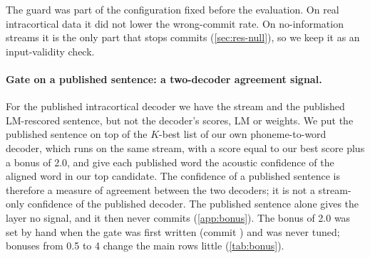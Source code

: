 The guard was part of the configuration fixed before the evaluation. On real intracortical data it did not lower the wrong-commit rate. On no-information streams it is the only part that stops commits (\cref{sec:res-null}), so we keep it as an input-validity check.

\paragraph{Gate on a published sentence: a two-decoder agreement signal.} For the published intracortical decoder we have the stream and the published LM-rescored sentence, but not the decoder's scores, LM or weights. We put the published sentence on top of the $K$-best list of our own phoneme-to-word decoder, which runs on the same stream, with a score equal to our best score plus a bonus of 2.0, and give each published word the acoustic confidence of the aligned word in our top candidate. The confidence of a published sentence is therefore a measure of agreement between the two decoders; it is not a stream-only confidence of the published decoder. The published sentence alone gives the layer no signal, and it then never commits (\cref{app:bonus}). The bonus of 2.0 was set by hand when the gate was first written (commit ) and was never tuned; bonuses from 0.5 to 4 change the main rows little (\cref{tab:bonus}).


